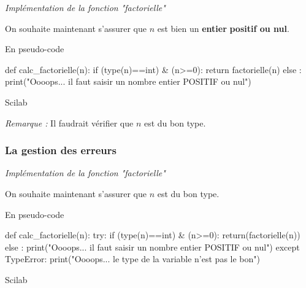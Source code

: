 \documentclass[11pt,oneside]{article}
\begin{document}
\begin{exemple}
\textit{Implémentation de la fonction "factorielle"}

On souhaite maintenant s'assurer que $n$ est bien un \textbf{entier} \textbf{positif ou nul}.


\begin{pseudo}
En pseudo-code
\end{pseudo}

\begin{py}
\begin{python}
def calc_factorielle(n):
    if (type(n)==int) & (n>=0):
        return factorielle(n) 
    else :
        print("Oooops... il faut saisir un nombre entier POSITIF ou nul")
\end{python}
\end{py}

\begin{sci}
\begin{scilab}
Scilab
\end{scilab}
\end{sci}

\textit{Remarque :} Il faudrait vérifier que $n$ est du bon type.
\end{exemple}


\subsubsection*{La gestion des erreurs}


\begin{exemple}
\textit{Implémentation de la fonction "factorielle"}

On souhaite maintenant s'assurer que $n$ est du bon type.

\begin{pseudo}
En pseudo-code
\end{pseudo}

\begin{py}
\begin{python}[moreemph={[4], 46, 48}]
def calc_factorielle(n):
    try:
        if (type(n)==int) & (n>=0):
            return(factorielle(n))
        else :
            print("Oooops... il faut saisir un nombre entier POSITIF ou nul")
    except TypeError:
        print("Oooops... le type de la variable n'est pas le bon")
\end{python}
\end{py}

\begin{sci}
\begin{scilab}
Scilab
\end{scilab}
\end{sci}

\end{exemple}
\end{document}
